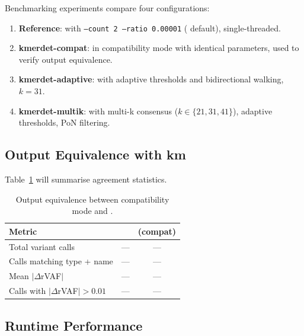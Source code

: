 Benchmarking experiments compare four configurations:
\begin{enumerate}
  \item \textbf{Reference}: \km{} with \texttt{--count 2 --ratio 0.00001} (\kam{}
    default), single-threaded.
  \item \textbf{kmerdet-compat}: \kmerdet{} in compatibility mode with identical
    parameters, used to verify output equivalence.
  \item \textbf{kmerdet-adaptive}: \kmerdet{} with adaptive thresholds and
    bidirectional walking, $k = 31$.
  \item \textbf{kmerdet-multik}: \kmerdet{} with multi-k consensus ($k \in
    \{21, 31, 41\}$), adaptive thresholds, PoN filtering.
\end{enumerate}

\subsection{Output Equivalence with km}
\label{sec:results-compat}


Table~\ref{tab:compat} will summarise agreement statistics.

\begin{table}[h]
  \centering
  \caption{Output equivalence between \kmerdet{} compatibility mode and \km{}.
    }
  \label{tab:compat}
  \begin{tabular}{lcc}
    \toprule
    Metric & \km{} & \kmerdet{} (compat) \\
    \midrule
    Total variant calls & --- & --- \\
    Calls matching type + name & --- & --- \\
    Mean $|\Delta$rVAF$|$ & --- & --- \\
    Calls with $|\Delta$rVAF$| > 0.01$ & --- & --- \\
    \bottomrule
  \end{tabular}
\end{table}

\subsection{Runtime Performance}
\label{sec:results-runtime}

